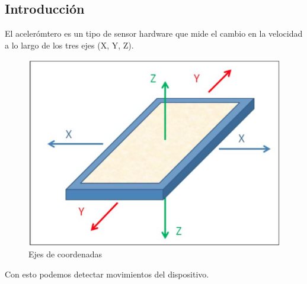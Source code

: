 \documentclass[12pt, a4paper, titlepage]{article}
\begin{document}
	\subsection{Introducción}
	\hspace{1mm}El acelerómtero es un tipo de sensor hardware que mide el cambio en la velocidad a lo largo de los tres ejes (X, Y, Z).
	\newline
	\begin{figure}[h!]
		\begin{center}
			\includegraphics[scale=0.65]{img/ejes.png}
			\caption{Ejes de coordenadas}
		\end{center}
	\end{figure}

	Con esto podemos detectar movimientos del dispositivo.
\end{document}
